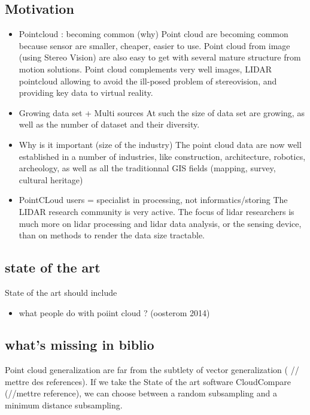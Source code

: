 	\subsection{Motivation}
		\begin{itemize}
			\item Pointcloud : becoming common (why)
				Point cloud are becoming common because sensor are smaller, cheaper, easier to use. Point cloud from image (using Stereo Vision) are also easy to get with several mature structure from motion solutions.
				Point cloud complements very well images, LIDAR pointcloud allowing to avoid the ill-posed problem of stereovision, and providing key data to virtual reality.
			\item Growing data set + Multi sources 
				At such the size of data set are growing, as well as the number of dataset and their diversity.
			\item Why is it important (size of the industry) 
				The point cloud data are now well established in a number of industries, like construction, architecture, robotics, archeology, as well as all the traditionnal GIS fields (mapping, survey, cultural heritage)
			\item PointCLoud users = specialist in processing, not informatics/storing 
				The LIDAR research community is very active. The focus of lidar researchers is much more on lidar processing and lidar data analysis, or the sensing device, than on methods to render the data size tractable. 
		\end{itemize}   
		
	\subsection{state of the art}
		State of the art should include 
		\begin{itemize}
			\item what people do with poiint cloud ? (oosterom 2014)
		\end{itemize}
	\subsection{what's missing in biblio} 
		
		Point cloud generalization are far from the subtlety of vector generalization ( // mettre des references).
		If we take the State of the art software CloudCompare (//mettre reference), we can choose between a random subsampling and a minimum distance subsampling.
		
